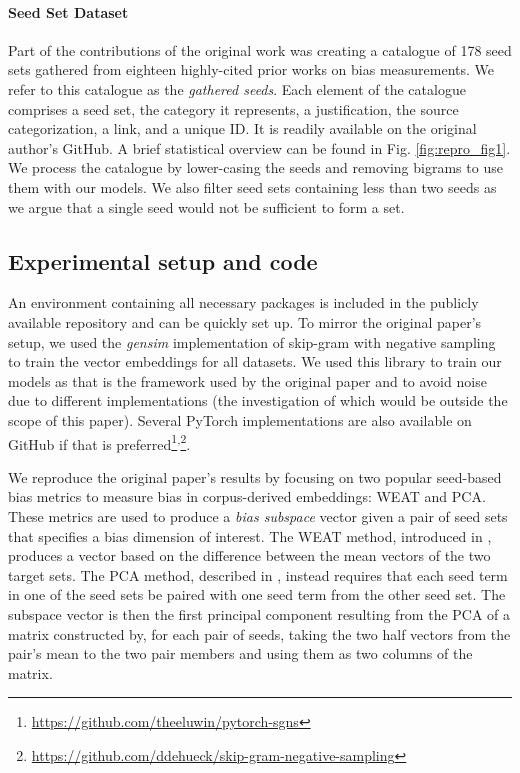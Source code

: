 \paragraph{Seed Set Dataset} Part of the contributions of the original work was creating a catalogue
of 178 seed sets gathered from eighteen highly-cited prior works on bias measurements. We refer to
this catalogue as the \emph{gathered seeds}. Each element of the catalogue comprises a seed set, the
category it represents, a justification, the source categorization, a link, and a unique ID. It is
readily available on the original author's GitHub. A brief
statistical overview can be found in Fig. \ref{fig:repro_fig1}. We process the catalogue by
lower-casing the seeds and removing bigrams to use them with our models. We also filter seed sets
containing less than two seeds as we argue that a single seed would not be sufficient to form a set.

\subsection{\label{sec:calc_agg}Experimental setup and code} An environment containing all necessary
packages is included in the publicly available repository and can be quickly set up. To mirror the
original paper's setup, we used the \emph{gensim} \citep{rehurek2010software} implementation of
skip-gram with negative sampling \citep{mikolov2013distributed} to train the vector embeddings for
all datasets. We used this library to train our models as that is the framework used by the original
paper and to avoid noise due to different implementations (the investigation of which would be
outside the scope of this paper). Several PyTorch \citep{pytorch} implementations are also available
on GitHub if that is
preferred\footnote{\href{https://github.com/theeluwin/pytorch-sgns}{https://github.com/theeluwin/pytorch-sgns}}\textsuperscript{,}\footnote{\href{https://github.com/ddehueck/skip-gram-negative-sampling}{https://github.com/ddehueck/skip-gram-negative-sampling}}.

We reproduce the original paper's results by focusing on two popular seed-based bias metrics to
measure bias in corpus-derived embeddings: WEAT and PCA. These metrics are used to produce
a \emph{bias subspace} vector given a pair of seed sets that specifies a bias dimension of interest.
The WEAT method, introduced in \citet{caliskan_semantics_2017}, produces a vector based on the
difference between the mean vectors of the two target sets. The PCA method, described in
\citet{bolukbasi_man_2016}, instead requires that each seed term in one of the seed sets be paired
with one seed term from the other seed set. The subspace vector is then the first principal
component resulting from the PCA of a matrix constructed by, for each pair of seeds, taking the two
half vectors from the pair's mean to the two pair members and using them as two columns of the
matrix.

